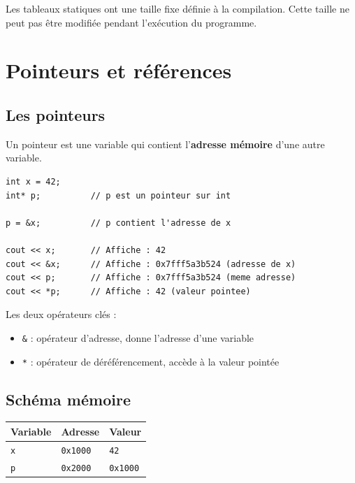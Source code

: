 \documentclass[12pt,a4paper]{article}
\begin{document}
\begin{important}
Les tableaux statiques ont une taille fixe définie à la compilation. Cette taille ne peut pas être modifiée pendant l'exécution du programme.
\end{important}

\section{Pointeurs et références}

\subsection{Les pointeurs}

Un pointeur est une variable qui contient l'\textbf{adresse mémoire} d'une autre variable.

\begin{lstlisting}[style=cpp, caption={Déclaration et utilisation de pointeurs}]
int x = 42;
int* p;          // p est un pointeur sur int

p = &x;          // p contient l'adresse de x

cout << x;       // Affiche : 42
cout << &x;      // Affiche : 0x7fff5a3b524 (adresse de x)
cout << p;       // Affiche : 0x7fff5a3b524 (meme adresse)
cout << *p;      // Affiche : 42 (valeur pointee)
\end{lstlisting}

\begin{regle}
Les deux opérateurs clés :
\begin{itemize}
    \item \texttt{\&} : opérateur d'adresse, donne l'adresse d'une variable
    \item \texttt{*} : opérateur de déréférencement, accède à la valeur pointée
\end{itemize}
\end{regle}

\subsection{Schéma mémoire}

\begin{table}[h!]
\centering
\begin{tabular}{lll}
\toprule
\textbf{Variable} & \textbf{Adresse} & \textbf{Valeur} \\
\midrule
\texttt{x} & \texttt{0x1000} & \texttt{42} \\
\texttt{p} & \texttt{0x2000} & \texttt{0x1000} \\
\bottomrule
\end{tabular}
\end{table}
\end{document}
